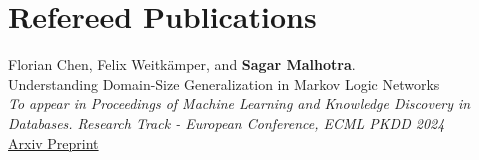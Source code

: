 \documentclass[10pt, a4paper]{article}
\newcommand{\years}[1]{\marginnote{\scriptsize #1}}
\begin{document}


\section*{Refereed Publications}

\noindent
\years{2024}Florian Chen, Felix Weitkämper, and \textbf{Sagar Malhotra}.\\
Understanding Domain-Size Generalization in Markov Logic Networks\\
\emph{To appear in Proceedings of Machine Learning and Knowledge Discovery in Databases. Research Track - European Conference, ECML PKDD 2024} \\
\href{https://arxiv.org/abs/2403.15933}{Arxiv Preprint}
\end{document}

